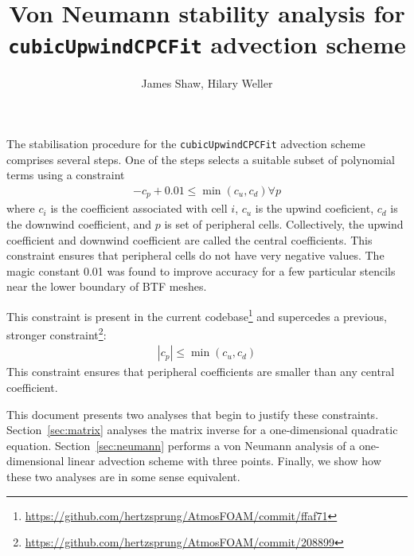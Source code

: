 \documentclass{article}
\title{Von Neumann stability analysis for \texttt{cubicUpwindCPCFit} advection scheme}
\author{James Shaw, Hilary Weller}
\begin{document}
\maketitle

The stabilisation procedure for the \texttt{cubicUpwindCPCFit} advection scheme comprises several steps.  One of the steps selects a suitable subset of polynomial terms using a constraint
\begin{align}
	-c_p + 0.01 \leq \min(c_u, c_d) \forall p
\end{align}
where $c_i$ is the coefficient associated with cell $i$, $c_u$ is the upwind coeficient, $c_d$ is the downwind coefficient, and $p$ is set of peripheral cells.  Collectively, the upwind coefficient and downwind coefficient are called the central coefficients.  This constraint ensures that peripheral cells do not have very negative values.  The magic constant \num{0.01} was found to improve accuracy for a few particular stencils near the lower boundary of BTF meshes.

This constraint is present in the current codebase\footnote{\url{https://github.com/hertzsprung/AtmosFOAM/commit/ffaf71}} and supercedes a previous, stronger constraint\footnote{\url{https://github.com/hertzsprung/AtmosFOAM/commit/208899}}:
\begin{align}
	|c_p| \leq \min(c_u, c_d)
\end{align}
This constraint ensures that peripheral coefficients are smaller than any central coefficient.

This document presents two analyses that begin to justify these constraints.  Section~\ref{sec:matrix} analyses the matrix inverse for a one-dimensional quadratic equation.  Section~\ref{sec:neumann} performs a von Neumann analysis of a one-dimensional linear advection scheme with three points.  Finally, we show how these two analyses are in some sense equivalent.
\end{document}
